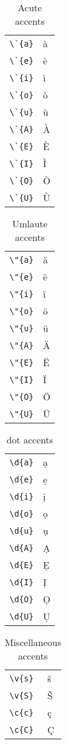 \documentclass{article}
\begin{document}
\begin{table}
\begin{center}
\begin{tabular}{ll}
\verb#\`{a}#& \`{a}\\
\verb#\`{e}#& \`{e}\\
\verb#\`{i}#& \`{i}\\
\verb#\`{o}#& \`{o}\\
\verb#\`{u}#& \`{u}\\
\verb#\`{A}#& \`{A}\\
\verb#\`{E}#& \`{E}\\
\verb#\`{I}#& \`{I}\\
\verb#\`{O}#& \`{O}\\
\verb#\`{U}#& \`{U}
\end{tabular}
\caption{Acute accents}
\end{center}
\end{table}

\begin{table}
\begin{center}
\begin{tabular}{ll}
\verb#\"{a}#& \"{a}\\
\verb#\"{e}#& \"{e}\\
\verb#\"{i}#& \"{i}\\
\verb#\"{o}#& \"{o}\\
\verb#\"{u}#& \"{u}\\
\verb#\"{A}#& \"{A}\\
\verb#\"{E}#& \"{E}\\
\verb#\"{I}#& \"{I}\\
\verb#\"{O}#& \"{O}\\
\verb#\"{U}#& \"{U}
\end{tabular}
\caption{Umlaute accents}
\end{center}
\end{table}

\begin{table}
\begin{center}
\begin{tabular}{ll}
\verb#\d{a}#& \d{a}\\
\verb#\d{e}#& \d{e}\\
\verb#\d{i}#& \d{i}\\
\verb#\d{o}#& \d{o}\\
\verb#\d{u}#& \d{u}\\
\verb#\d{A}#& \d{A}\\
\verb#\d{E}#& \d{E}\\
\verb#\d{I}#& \d{I}\\
\verb#\d{O}#& \d{O}\\
\verb#\d{U}#& \d{U}
\end{tabular}
\caption{dot accents}
\end{center}
\end{table}

\begin{table}
\begin{center}
\begin{tabular}{ll}
\verb#\v{s}#& \v{s}\\
\verb#\v{S}#& \v{S}\\
\verb#\c{c}#& \c {c}\\
\verb#\c{C}#& \c {C}
\end{tabular}
\caption{Miscellaneous accents}
\end{center}
\end{table}
\end{document}
